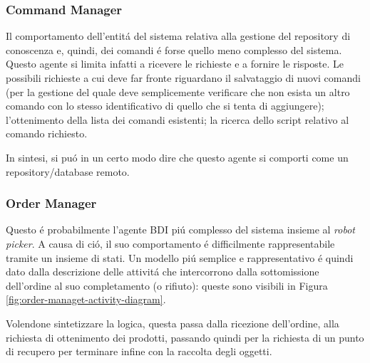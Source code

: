 \subsubsection{Command Manager}
Il comportamento dell'entit\'a del sistema relativa alla gestione del repository di conoscenza e, quindi, dei comandi \'e forse quello meno complesso del sistema. Questo agente si limita infatti a ricevere le richieste e a fornire le risposte. Le possibili richieste a cui deve far fronte riguardano il salvataggio di nuovi comandi (per la gestione del quale deve semplicemente verificare che non esista un altro comando con lo stesso identificativo di quello che si tenta di aggiungere); l'ottenimento della lista dei comandi esistenti; la ricerca dello script relativo al comando richiesto.

In sintesi, si pu\'o in un certo modo dire che questo agente si comporti come un repository/database remoto.

\subsubsection{Order Manager}
Questo \'e probabilmente l'agente BDI pi\'u complesso del sistema insieme al \textit{robot picker}. A causa di ci\'o, il suo comportamento \'e difficilmente rappresentabile tramite un insieme di stati. Un modello pi\'u semplice e rappresentativo \'e quindi dato dalla descrizione delle attivit\'a che intercorrono dalla sottomissione dell'ordine al suo completamento (o rifiuto): queste sono visibili in Figura \ref{fig:order-managet-activity-diagram}.

Volendone sintetizzare la logica, questa passa dalla ricezione dell'ordine, alla richiesta di ottenimento dei prodotti, passando quindi per la richiesta di un punto di recupero per terminare infine con la raccolta degli oggetti.

